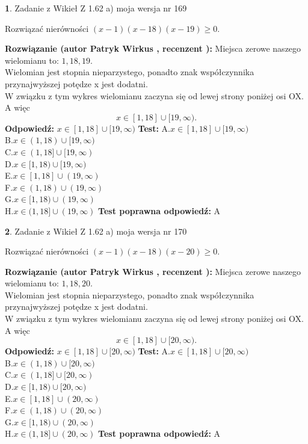 \documentclass[12pt, a4paper]{article}
\theoremstyle{definition} %
\newtheorem{zad}{}
\newcommand{\zadStart}[1]{\begin{zad}#1\newline}
\newcommand{\zadStop}{\end{zad}}
\newcommand{\rozwStart}[2]{\noindent \textbf{Rozwiązanie (autor #1 , recenzent #2): }\newline}
\newcommand{\rozwStop}{\newline}
\newcommand{\odpStart}{\noindent \textbf{Odpowiedź:}\newline}
\newcommand{\odpStop}{\newline}
\newcommand{\testStart}{\noindent \textbf{Test:}\newline}
\newcommand{\testStop}{\newline}
\newcommand{\kluczStart}{\noindent \textbf{Test poprawna odpowiedź:}\newline}
\newcommand{\kluczStop}{\newline}
\begin{document}
\zadStart{Zadanie z Wikieł Z 1.62 a) moja wersja nr 169}

Rozwiązać nierówności $(x-1)(x-18)(x-19)\ge0$.
\zadStop
\rozwStart{Patryk Wirkus}{}
Miejsca zerowe naszego wielomianu to: $1, 18, 19$.\\
Wielomian jest stopnia nieparzystego, ponadto znak współczynnika przy\linebreak najwyższej potędze x jest dodatni.\\ W związku z tym wykres wielomianu zaczyna się od lewej strony poniżej osi OX. A więc $$x \in [1,18] \cup [19,\infty).$$
\rozwStop
\odpStart
$x \in [1,18] \cup [19,\infty)$
\odpStop
\testStart
A.$x \in [1,18] \cup [19,\infty)$\\
B.$x \in (1,18) \cup [19,\infty)$\\
C.$x \in (1,18] \cup [19,\infty)$\\
D.$x \in [1,18) \cup [19,\infty)$\\
E.$x \in [1,18] \cup (19,\infty)$\\
F.$x \in (1,18) \cup (19,\infty)$\\
G.$x \in [1,18) \cup (19,\infty)$\\
H.$x \in (1,18] \cup (19,\infty)$
\testStop
\kluczStart
A
\kluczStop



\zadStart{Zadanie z Wikieł Z 1.62 a) moja wersja nr 170}

Rozwiązać nierówności $(x-1)(x-18)(x-20)\ge0$.
\zadStop
\rozwStart{Patryk Wirkus}{}
Miejsca zerowe naszego wielomianu to: $1, 18, 20$.\\
Wielomian jest stopnia nieparzystego, ponadto znak współczynnika przy\linebreak najwyższej potędze x jest dodatni.\\ W związku z tym wykres wielomianu zaczyna się od lewej strony poniżej osi OX. A więc $$x \in [1,18] \cup [20,\infty).$$
\rozwStop
\odpStart
$x \in [1,18] \cup [20,\infty)$
\odpStop
\testStart
A.$x \in [1,18] \cup [20,\infty)$\\
B.$x \in (1,18) \cup [20,\infty)$\\
C.$x \in (1,18] \cup [20,\infty)$\\
D.$x \in [1,18) \cup [20,\infty)$\\
E.$x \in [1,18] \cup (20,\infty)$\\
F.$x \in (1,18) \cup (20,\infty)$\\
G.$x \in [1,18) \cup (20,\infty)$\\
H.$x \in (1,18] \cup (20,\infty)$
\testStop
\kluczStart
A
\kluczStop
\end{document}
